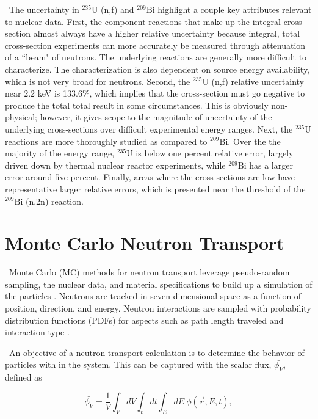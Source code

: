 \ The uncertainty in $\mathrm{^{235}U}$ (n,f)  and $\mathrm{^{209}Bi}$ highlight a couple key attributes relevant to nuclear data. 
First, the component reactions that make up the integral cross-section almost always have a higher relative uncertainty because integral, total cross-section experiments can more accurately be measured through attenuation of a ``beam" of neutrons. 
The underlying reactions are generally more difficult to characterize. 
The characterization is also dependent on source energy availability, which is not very broad for neutrons. 
Second, the $\mathrm{^{235}U}$ (n,f) relative uncertainty near 2.2 keV is 133.6\%, which implies that the cross-section must go negative to produce the total total result in some circumstances. 
This is obviously non-physical; however, it gives scope to the magnitude of uncertainty of the underlying cross-sections over difficult experimental energy ranges. 
Next, the $\mathrm{^{235}U}$ reactions are more thoroughly studied as compared to $\mathrm{^{209}Bi}$. 
Over the the majority of the energy range, $\mathrm{^{235}U}$ is below one percent relative error, largely driven down by thermal nuclear reactor experiments, while $\mathrm{^{209}Bi}$ has a larger error around five percent. 
Finally, areas where the cross-sections are low have representative larger relative errors, which is presented near the threshold of the $\mathrm{^{209}Bi}$ (n,2n) reaction. 

\section{Monte Carlo Neutron Transport}

\ Monte Carlo (MC) methods for neutron transport leverage pseudo-random sampling, the nuclear data, and material specifications to build up a simulation of the particles \cite{Luciano2012a}. 
Neutrons are tracked in seven-dimensional space as a function of position, direction, and energy. 
Neutron interactions are sampled with probability distribution functions (PDFs) for aspects such as path length traveled and interaction type \cite{Lewis1984}. 

\ An objective of a neutron transport calculation is to determine the behavior of particles with in the system. 
This can be captured with the scalar flux, $\bar{\phi_V}$, defined as

\begin{equation} \label{eq:flux}
\bar{\phi_V} = \frac{1}{V}\int_V dV \int_t dt \int_E dE\: \phi(\vec{r}, E,t),
\end{equation}

